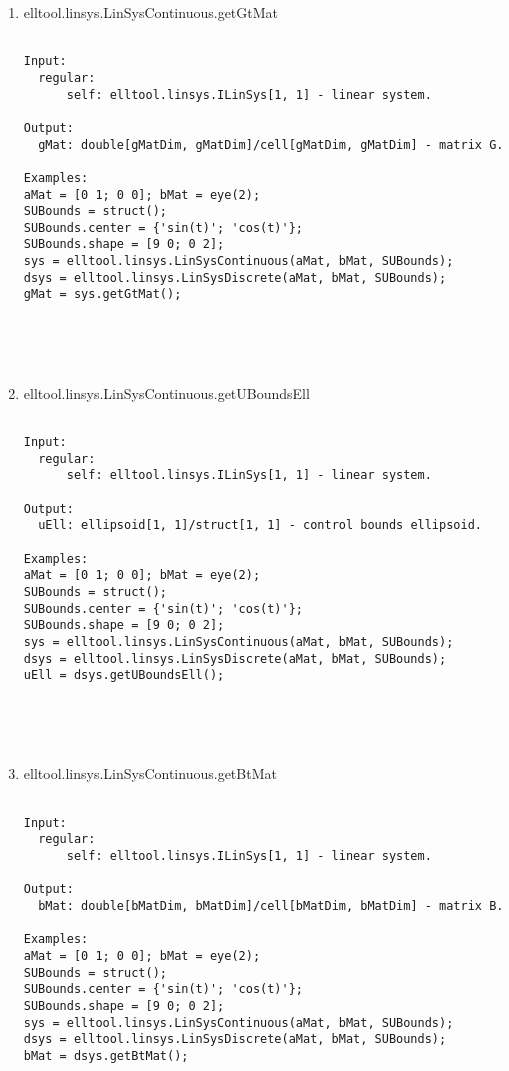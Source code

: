 \begin{enumerate}
\begin{lstlisting}
\end{lstlisting}
\fontfamily{\familydefault}
\selectfont
\item {elltool.linsys.LinSysContinuous.getGtMat}
\selectfont
\begin{lstlisting}

Input:
  regular:
      self: elltool.linsys.ILinSys[1, 1] - linear system.

Output:
  gMat: double[gMatDim, gMatDim]/cell[gMatDim, gMatDim] - matrix G.

Examples:
aMat = [0 1; 0 0]; bMat = eye(2);
SUBounds = struct();
SUBounds.center = {'sin(t)'; 'cos(t)'};
SUBounds.shape = [9 0; 0 2];
sys = elltool.linsys.LinSysContinuous(aMat, bMat, SUBounds);
dsys = elltool.linsys.LinSysDiscrete(aMat, bMat, SUBounds);
gMat = sys.getGtMat();





\end{lstlisting}
\fontfamily{\familydefault}
\selectfont
\item {elltool.linsys.LinSysContinuous.getUBoundsEll}
\selectfont
\begin{lstlisting}

Input:
  regular:
      self: elltool.linsys.ILinSys[1, 1] - linear system.

Output:
  uEll: ellipsoid[1, 1]/struct[1, 1] - control bounds ellipsoid.

Examples:
aMat = [0 1; 0 0]; bMat = eye(2);
SUBounds = struct();
SUBounds.center = {'sin(t)'; 'cos(t)'};
SUBounds.shape = [9 0; 0 2];
sys = elltool.linsys.LinSysContinuous(aMat, bMat, SUBounds);
dsys = elltool.linsys.LinSysDiscrete(aMat, bMat, SUBounds);
uEll = dsys.getUBoundsEll();





\end{lstlisting}
\fontfamily{\familydefault}
\selectfont
\item {elltool.linsys.LinSysContinuous.getBtMat}
\selectfont
\begin{lstlisting}

Input:
  regular:
      self: elltool.linsys.ILinSys[1, 1] - linear system.

Output:
  bMat: double[bMatDim, bMatDim]/cell[bMatDim, bMatDim] - matrix B.

Examples:
aMat = [0 1; 0 0]; bMat = eye(2);
SUBounds = struct();
SUBounds.center = {'sin(t)'; 'cos(t)'};
SUBounds.shape = [9 0; 0 2];
sys = elltool.linsys.LinSysContinuous(aMat, bMat, SUBounds);
dsys = elltool.linsys.LinSysDiscrete(aMat, bMat, SUBounds);
bMat = dsys.getBtMat();






\end{lstlisting}
\end{enumerate}
